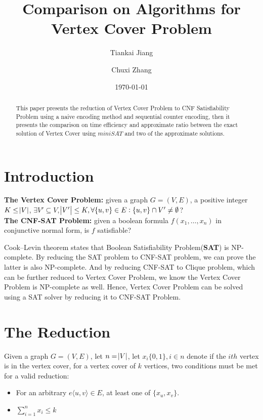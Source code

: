 \documentclass[11pt]{article}
\title{Comparison on Algorithms for Vertex Cover Problem}
\author{Tiankai Jiang \and Chuxi Zhang}
\date{\today}
\begin{document}
\maketitle

\begin{abstract}
This paper presents the reduction of Vertex Cover Problem to CNF Satisfiability Problem using a naive encoding method and sequential counter encoding, then it presents the comparison on time efficiency and approximate ratio between the exact solution of Vertex Cover using $miniSAT$ and two of the approximate solutions.
\end{abstract}
\section{Introduction}\label{section-introduction}
\textbf{The Vertex Cover Problem:} given a graph $G=(V,E)$, a positive integer $K\leq \abs{V}$, $\exists V'\subseteq V,$\linebreak$\abs{V'} \leq K, \forall \{u,v\}\in E: \{u,v\}\cap V' \neq \emptyset$?\\
\textbf{The CNF-SAT Problem:} given a boolean formula $f(x_1,\ldots ,x_n)$ in conjunctive normal form, is $f$ satisfiable? 

Cook–Levin theorem\cite{Cook:1971:CTP:800157.805047} states that Boolean Satisfiability Problem(\textbf{SAT}) is NP-complete. By reducing the SAT problem to CNF-SAT problem, we can prove the latter is also NP-complete. And by reducing CNF-SAT to Clique problem, which can be further reduced to Vertex Cover Problem, we know the Vertex Cover Problem is NP-complete as well. Hence, Vertex Cover Problem can be solved using a SAT solver by reducing it to CNF-SAT Problem.

\section{The Reduction}\label{section-reduction}
Given a graph $G=(V,E)$, let $n=\abs{V}$, let $x_i\{0, 1\}, i \in n$ denote if the $ith$ vertex is in the vertex cover, for a vertex cover of $k$ vertices, two conditions must be met\cite{Stamm-wilbrandt93programmingin} for a valid reduction:
\begin{itemize}
  \item For an arbitrary $e\langle u,v\rangle \in E$, at least one of $\{x_u,x_v\}$.
  \item $\sum\limits_{i=1}^{n}x_i\leq k$
\end{itemize}
\end{document}
